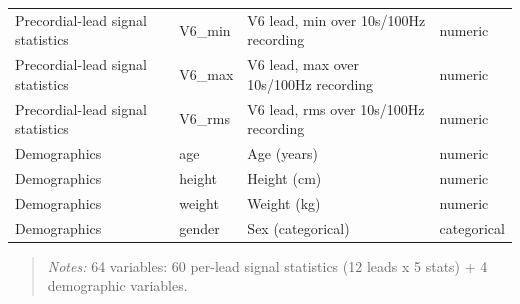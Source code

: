 \begin{table}[htbp]
\begin{tabular}{llll}
Precordial-lead signal statistics & V6\_min & V6 lead, min over 10s/100Hz recording & numeric \\
Precordial-lead signal statistics & V6\_max & V6 lead, max over 10s/100Hz recording & numeric \\
Precordial-lead signal statistics & V6\_rms & V6 lead, rms over 10s/100Hz recording & numeric \\
Demographics & age & Age (years) & numeric \\
Demographics & height & Height (cm) & numeric \\
Demographics & weight & Weight (kg) & numeric \\
Demographics & gender & Sex (categorical) & categorical \\
\bottomrule
\end{tabular}

\end{table}


\begin{quote}\small
\textit{Notes:} 64 variables: 60 per-lead signal statistics (12 leads x 5 stats) + 4 demographic variables.
\end{quote}